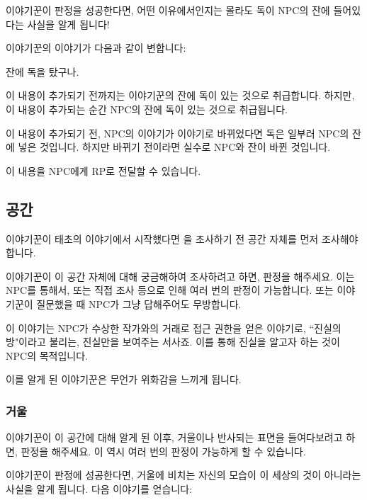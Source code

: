 \documentclass{report}
\begin{document}
	이야기꾼이 판정을 성공한다면, 어떤 이유에서인지는 몰라도 독이 NPC의 잔에 들어있다는 사실을 알게 됩니다!
	
	이야기꾼의  이야기가 다음과 같이 변합니다:
	
	\begin{lite}{잔에 독을 탔구나.}
	\end{lite}
	
	이 내용이 추가되기 전까지는 이야기꾼의 잔에 독이 있는 것으로 취급합니다. 하지만, 이 내용이 추가되는 순간 NPC의 잔에 독이 있는 것으로 취급됩니다.
	
	이 내용이 추가되기 전, NPC의  이야기가  이야기로 바뀌었다면 독은 일부러 NPC의 잔에 넣은 것입니다. 하지만 바뀌기 전이라면 실수로 NPC와 잔이 바뀐 것입니다.
	
	이 내용을 NPC에게 RP로 전달할 수 있습니다.
	
	\subsection{공간}
	
	이야기꾼이 태초의 이야기에서 시작했다면 을 조사하기 전 공간 자체를 먼저 조사해야 합니다.
	
	이야기꾼이 이 공간 자체에 대해 궁금해하여 조사하려고 하면, 판정을 해주세요. 이는 NPC를 통해서, 또는 직접 조사 등으로 인해 여러 번의 판정이 가능합니다. 또는 이야기꾼이 질문했을 때 NPC가 그냥 답해주어도 무방합니다.
	
	이 이야기는 NPC가 수상한 작가와의 거래로 접근 권한을 얻은 이야기로, ``진실의 방"이라고 불리는, 진실만을 보여주는 서사죠. 이를 통해 진실을 알고자 하는 것이 NPC의 목적입니다.
	
	이를 알게 된 이야기꾼은 무언가 위화감을 느끼게 됩니다.
	
	\hypertarget{poison:mirror}{}
	\subsubsection{거울}
	
	이야기꾼이 이 공간에 대해 알게 된 이후, 거울이나 반사되는 표면을 들여다보려고 하면, 판정을 해주세요. 이 역시 여러 번의 판정이 가능하게 할 수 있습니다.
	
	이야기꾼이 판정에 성공한다면, 거울에 비치는 자신의 모습이 이 세상의 것이 아니라는 사실을 알게 됩니다. 다음 이야기를 얻습니다:
	
\end{document}
